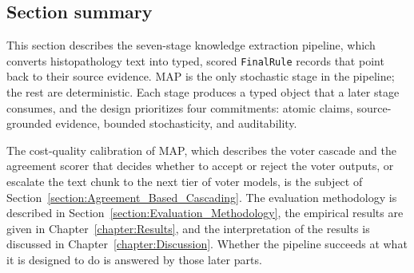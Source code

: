 \subsection{Section summary}\label{subsec:knowledge-section-summary}

This section describes the seven-stage knowledge extraction pipeline, which converts histopathology text into typed, scored \texttt{FinalRule} records that point back to their source evidence. MAP is the only stochastic stage in the pipeline; the rest are deterministic. Each stage produces a typed object that a later stage consumes, and the design prioritizes four commitments: atomic claims, source-grounded evidence, bounded stochasticity, and auditability. 

The cost-quality calibration of MAP, which describes the voter cascade and the agreement scorer that decides whether to accept or reject the voter outputs, or escalate the text chunk to the next tier of voter models, is the subject of Section~\ref{section:Agreement_Based_Cascading}. The evaluation methodology is described in Section~\ref{section:Evaluation_Methodology}, the empirical results are given in Chapter~\ref{chapter:Results}, and the interpretation of the results is discussed in Chapter~\ref{chapter:Discussion}. Whether the pipeline succeeds at what it is designed to do is answered by those later parts.